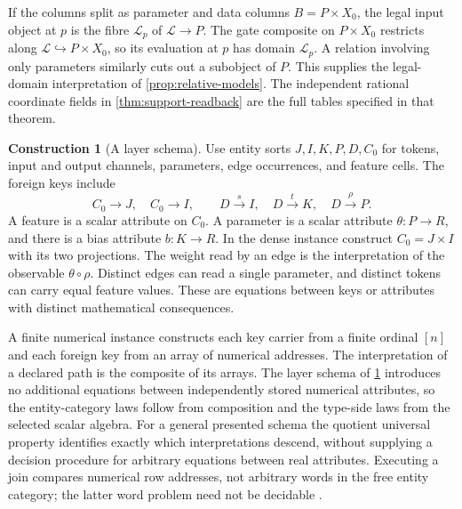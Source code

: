 \documentclass[11pt,a4paper]{article}
\theoremstyle{definition}
\newtheorem{construction}[construction]{Construction}
\theoremstyle{remark}\newaliascnt{remark}{theorem}
\numberwithin{equation}{section}
\begin{document}
If the columns split as parameter and data columns \(B=P\times X_0\), the legal input object at \(p\) is the fibre \(\mathcal L_p\) of \(\mathcal L\to P\). The gate composite on \(P\times X_0\) restricts along \(\mathcal L\hookrightarrow P\times X_0\), so its evaluation at \(p\) has domain \(\mathcal L_p\). A relation involving only parameters similarly cuts out a subobject of \(P\). This supplies the legal-domain interpretation of \cref{prop:relative-models}. The independent rational coordinate fields in \cref{thm:support-readback} are the full tables specified in that theorem.

\begin{construction}[A layer schema]\label{con:layer-schema}
Use entity sorts \(J,I,K,P,D,C_0\) for tokens, input and output channels, parameters, edge occurrences, and feature cells. The foreign keys include
\[
 C_0\to J,\quad C_0\to I,\qquad
 D\xrightarrow{s} I,\quad D\xrightarrow{t}K,\quad D\xrightarrow{\rho}P .
\]
A feature is a scalar attribute on \(C_0\). A parameter is a scalar attribute \(\theta:P\to R\), and there is a bias attribute \(b:K\to R\). In the dense instance construct \(C_0=J\times I\) with its two projections. The weight read by an edge is the interpretation of the observable \(\theta\circ\rho\). Distinct edges can read a single parameter, and distinct tokens can carry equal feature values. These are equations between keys or attributes with distinct mathematical consequences.
\end{construction}

A finite numerical instance constructs each key carrier from a finite ordinal $[n]$ and each foreign key from an array of numerical addresses. The interpretation of a declared path is the composite of its arrays. The layer schema of \cref{con:layer-schema} introduces no additional equations between independently stored numerical attributes, so the entity-category laws follow from composition and the type-side laws from the selected scalar algebra. For a general presented schema the quotient universal property identifies exactly which interpretations descend, without supplying a decision procedure for arbitrary equations between real attributes. Executing a join compares numerical row addresses, not arbitrary words in the free entity category; the latter word problem need not be decidable \cite{algebraic-databases-errata}.
\end{document}
